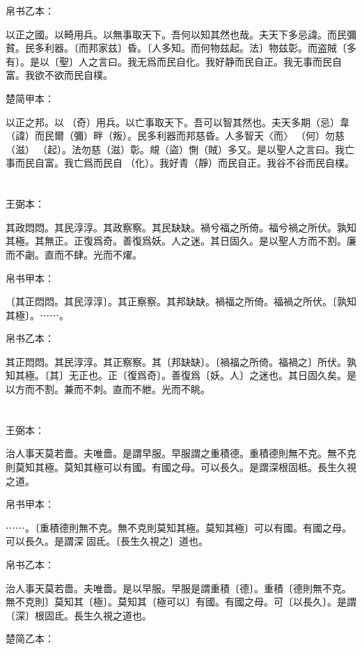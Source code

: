 \documentclass[a5paper]{ctexbook}
\begin{document}
    帛书乙本：

    以正之國。以畸用兵。以無事取天下。吾何以知其然也哉。夫天下多忌諱。而民彌貧。民多利器。〔而邦家兹〕昏。〔人多知。而何物兹起。法〕物兹彰。而盗賊〔多有〕。是以〔聖〕人之言曰。我无爲而民自化。我好静而民自正。我无事而民自富。我欲不欲而民自樸。

    楚简甲本：

    以正之邦。以󶵊（奇）用兵。以亡事取天下。吾可以智其然也。夫天多期（忌）韋（諱）而民爾（彌）畔（叛）。民多利器而邦慈昏。人多智天〈而〉𢦪（何）勿慈（滋）󶵋（起）。法勿慈（滋）彰。覜（盜）惻（賊）多又。是以聖人之言曰。我亡事而民自富。我亡爲而民自󶵍（化）。我好青（靜）而民自正。我谷不谷而民自樸。

    \chapter{}
    王弼本：

    其政悶悶。其民淳淳。其政察察。其民缺缺。禍兮福之所倚。福兮禍之所伏。孰知其極。其無正。正復爲奇。善復爲妖。人之迷。其日固久。是以聖人方而不割。廉而不劌。直而不肆。光而不燿。

    
    帛书甲本：

    〔其正悶悶。其民淳淳〕。其正察察。其邦缺缺。禍福之所倚。福禍之所伏。〔孰知其極〕。⋯⋯。

    帛书乙本：

    其正悶悶。其民淳淳。其正察察。其〔邦缺缺〕。〔禍福之所倚。福禍之〕所伏。孰知其極。〔其〕无正也。正〔復爲奇〕。善復爲〔妖。人〕之迷也。其日固久矣。是以方而不割。兼而不刺。直而不紲。光而不眺。

    \chapter{}
    王弼本：

    治人事天莫若嗇。夫唯嗇。是謂早服。早服謂之重積德。重積德則無不克。無不克則莫知其極。莫知其極可以有國。有國之母。可以長久。是謂深根固柢。長生久視之道。

    
    帛书甲本：

    ⋯⋯。〔重積德則無不克。無不克則莫知其極。莫知其極〕可以有國。有國之母。可以長久。是謂深󱁆固氐。〔長生久視之〕道也。

    帛书乙本：

    治人事天莫若嗇。夫唯嗇。是以早服。早服是謂重積〔德〕。重積〔德則無不克。無不克則〕莫知其〔極〕。莫知其〔極可以〕有國。有國之母。可〔以長久〕。是謂〔深〕根固氐。長生久視之道也。

    楚简乙本：
\end{document}
